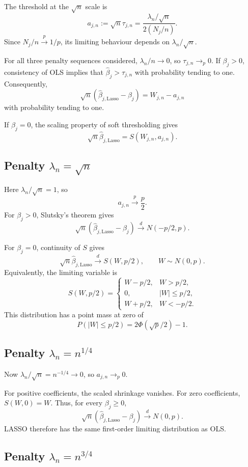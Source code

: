 \documentclass[11pt]{article}
\begin{document}
The threshold at the $\sqrt{n}$ scale is
\[
a_{j,n}
:=\sqrt{n}\tau_{j,n}
=
\frac{\lambda_n/\sqrt{n}}{2(N_j/n)}.
\]
Since $N_j/n\xrightarrow{p}1/p$, its limiting
behaviour depends on $\lambda_n/\sqrt{n}$.

For all three penalty sequences considered,
$\lambda_n/n\to0$, so $\tau_{j,n}\to_p0$.
If $\beta_j>0$, consistency of OLS implies
that $\widehat{\beta}_j>\tau_{j,n}$ with
probability tending to one. Consequently,
\[
\sqrt{n}
(\widehat{\beta}_{j,\mathrm{Lasso}}-\beta_j)
=
W_{j,n}-a_{j,n}
\]
with probability tending to one.

If $\beta_j=0$, the scaling property of
soft thresholding gives
\[
\sqrt{n}\widehat{\beta}_{j,\mathrm{Lasso}}
=S(W_{j,n},a_{j,n}).
\]

\subsection*{Penalty $\lambda_n=\sqrt{n}$}

Here $\lambda_n/\sqrt{n}=1$, so
\[
a_{j,n}\xrightarrow{p}\frac{p}{2}.
\]
For $\beta_j>0$, Slutsky's theorem gives
\[
\boxed{
\sqrt{n}
(\widehat{\beta}_{j,\mathrm{Lasso}}-\beta_j)
\xrightarrow{d}N(-p/2,p).
}
\]

For $\beta_j=0$, continuity of $S$ gives
\[
\boxed{
\sqrt{n}\widehat{\beta}_{j,\mathrm{Lasso}}
\xrightarrow{d}S(W,p/2),
\qquad W\sim N(0,p).
}
\]
Equivalently, the limiting variable is
\[
S(W,p/2)=
\begin{cases}
W-p/2, & W>p/2,\\
0, & |W|\leq p/2,\\
W+p/2, & W<-p/2.
\end{cases}
\]
This distribution has a point mass at zero of
\[
P(|W|\leq p/2)
=2\Phi(\sqrt{p}/2)-1.
\]

\subsection*{Penalty $\lambda_n=n^{1/4}$}

Now $\lambda_n/\sqrt{n}=n^{-1/4}\to0$,
so $a_{j,n}\to_p0$.

For positive coefficients, the scaled shrinkage
vanishes. For zero coefficients,
$S(W,0)=W$. Thus, for every $\beta_j\geq0$,
\[
\boxed{
\sqrt{n}
(\widehat{\beta}_{j,\mathrm{Lasso}}-\beta_j)
\xrightarrow{d}N(0,p).
}
\]
LASSO therefore has the same first-order
limiting distribution as OLS.

\subsection*{Penalty $\lambda_n=n^{3/4}$}
\end{document}
